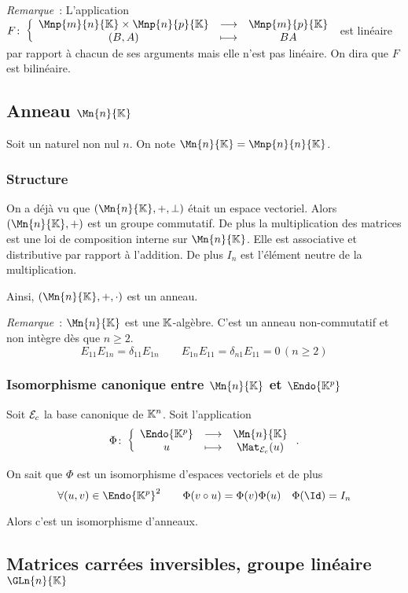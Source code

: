 \emph{Remarque}~: L'application $\fonction{F}{\Mnp{m}{n}{\K}\times \Mnp{n}{p}{\K}}{\Mnp{m}{p}{\K}}{(B,A)}{BA}$ est linéaire par rapport à chacun de ses arguments mais elle n'est pas linéaire. On dira que $F$ est bilinéaire.

\subsection{Anneau $\Mn{n}{\K}$}

Soit un naturel non nul $n$. On note $\Mn{n}{\K}=\Mnp{n}{n}{\K}$.

\subsubsection{Structure}

On a déjà vu que $(\Mn{n}{\K},+,\perp)$ était un espace vectoriel. Alors $(\Mn{n}{\K},+)$ est un groupe commutatif. De plus la multiplication des matrices est une loi de composition interne sur $\Mn{n}{\K}$. Elle est associative et distributive par rapport à l'addition. De plus $I_n$ est l'élément neutre de la multiplication.

Ainsi, $(\Mn{n}{\K},+,\cdot)$ est un anneau.

\emph{Remarque}~: $\Mn{n}{\K}$ est une $\mathbb{K}$-algèbre. C'est un anneau non-commutatif et non intègre dès que $n\geq 2$.
\begin{equation}
  E_{11}E_{1n}=\delta_{11}E_{1n} \qquad E_{1n}E_{11}=\delta_{n1}E_{11}=0 \, (n\geq 2)
\end{equation}

\subsubsection{Isomorphisme canonique entre $\Mn{n}{\K}$ et $\Endo{\K^p}$}

Soit $\mathcal{E}_c$ la base canonique de $\mathbb{K}^n$. Soit l'application
\begin{equation}
  \fonction{\Phi}{\Endo{\K^p}}{\Mn{n}{\K}}{u}{\Mat_{\E_c}(u)}.
\end{equation}

On sait que $\Phi$ est un isomorphisme d'espaces vectoriels et de plus
\begin{equation}
  \forall (u,v) \in \Endo{\K^p}^2 \qquad \Phi(v \circ u) =\Phi(v) \Phi(u) \quad \Phi(\Id)=I_n
\end{equation}

Alors c'est un isomorphisme d'anneaux.

\subsection{Matrices carrées inversibles, groupe linéaire $\GLn{n}{\K}$}


